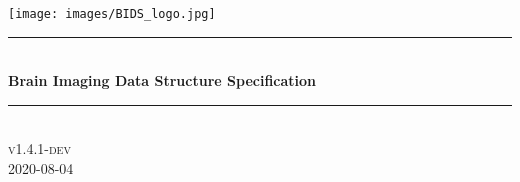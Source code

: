 \begin{titlepage}

\newcommand{\HRule}{\rule{\linewidth}{0.5mm}} %

\center %




\texttt{[image: images/BIDS\_logo.jpg]}\\[1cm] 


\HRule \\[0.4cm]
{ \huge \bfseries Brain Imaging Data Structure Specification}\\[0.4cm] %
\HRule \\[1.5cm]


\textsc{\large v1.4.1-dev}\\[0.5cm]{\large 2020-08-04}\\[2cm]\vfill\end{titlepage}